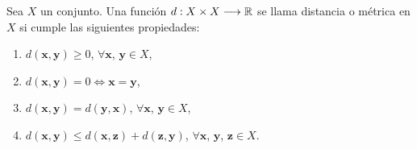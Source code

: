 \begin{definition}\label{def:metrica}
    Sea $X$ un conjunto. Una función $d: X \times X \longrightarrow \RR$ se llama distancia o métrica en $X$ si cumple las siguientes propiedades:
    \begin{enumerate}[label=\roman*.]
        \item $d(\mathbf{x}, \mathbf{y}) \geq 0$, $\forall \mathbf{x}$, $\mathbf{y} \in X$,
        \item $d(\mathbf{x}, \mathbf{y}) = 0 \Longleftrightarrow \mathbf{x} = \mathbf{y}$,
        \item $d(\mathbf{x}, \mathbf{y}) = d(\mathbf{y}, \mathbf{x})$, $\forall \mathbf{x}$, $\mathbf{y} \in X$,
        \item $d(\mathbf{x}, \mathbf{y}) \leq d(\mathbf{x}, \mathbf{z}) + d(\mathbf{z}, \mathbf{y})$, $\forall \mathbf{x}$, $\mathbf{y}$, $\mathbf{z} \in X$.
    \end{enumerate}
\end{definition}

